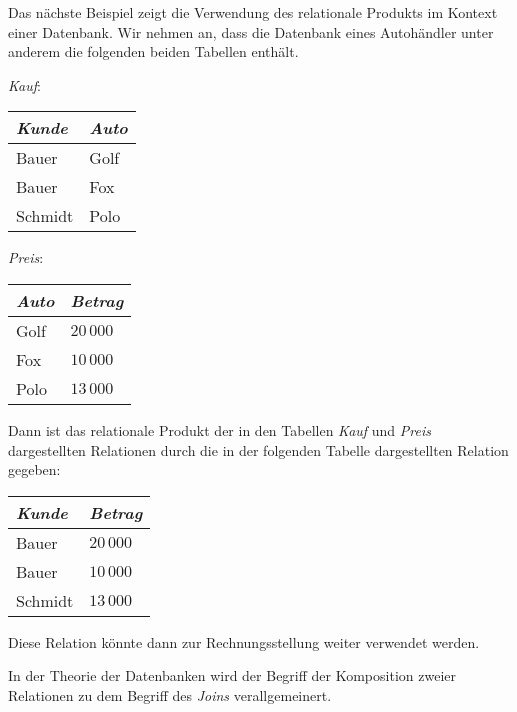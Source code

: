 \example
Das nächste Beispiel zeigt die Verwendung des relationale Produkts im Kontext einer
Datenbank.  Wir nehmen an, dass die Datenbank eines Autohändler unter anderem die
folgenden beiden Tabellen enthält.
\begin{center}
\textsl{Kauf}:  \begin{tabular}[t]{|l|l|}
\hline
\textsl{Kunde} & \textsl{Auto} \\
\hline
\hline
  Bauer   & Golf \\
\hline
  Bauer   & Fox  \\
\hline
  Schmidt & Polo \\
\hline
  \end{tabular}
\qquad \textsl{Preis}:
  \begin{tabular}[t]{|l|l|}
\hline
\textsl{Auto} & \textsl{Betrag} \\
\hline
\hline
  Golf    & $20\,000$ \\
\hline
  Fox     & $10\,000$ \\
\hline
  Polo    & $13\,000$ \\
\hline
  \end{tabular}
\end{center}
Dann ist das relationale Produkt der in den Tabellen \textsl{Kauf} und \textsl{Preis}
dargestellten Relationen durch die in der folgenden Tabelle dargestellten Relation
gegeben:

\begin{center}
  \begin{tabular}[t]{|l|l|}
\hline
\textsl{Kunde} & \textsl{Betrag} \\
\hline
\hline
  Bauer   & $20\,000$ \\
\hline
  Bauer   & $10\,000$ \\
\hline
  Schmidt & $13\,000$ \\
\hline
  \end{tabular} 
\end{center}
Diese Relation könnte dann zur Rechnungsstellung weiter verwendet werden. \eox
\vspace{0.2cm}

\remark
In der Theorie der Datenbanken wird der Begriff der Komposition zweier
Relationen zu dem Begriff des \emph{Joins} verallgemeinert.
\eox

